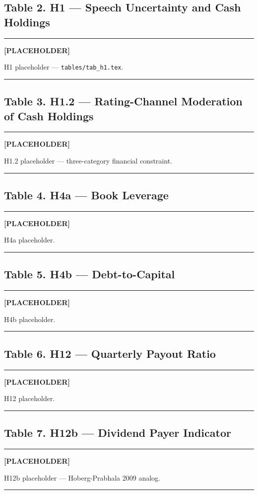 \documentclass[11pt,a4paper,twocolumn]{article}
\newenvironment{placeholder}{%
  \par\medskip\noindent%
  {\color{placeholderaccent}\rule{\linewidth}{0.4pt}}\par%
  \noindent\textbf{\color{placeholderaccent}[PLACEHOLDER]}\par%
  \smallskip\itshape%
}{%
  \par\upshape\smallskip%
  {\color{placeholderaccent}\rule{\linewidth}{0.4pt}}\par\medskip%
}
\begin{document}
\subsection*{Table 2. H1 --- Speech Uncertainty and Cash Holdings}
% 
\begin{placeholder}
H1 placeholder --- \texttt{tables/tab\_h1.tex}.
\end{placeholder}

\subsection*{Table 3. H1.2 --- Rating-Channel Moderation of Cash Holdings}
% 
\begin{placeholder}
H1.2 placeholder --- three-category financial constraint.
\end{placeholder}

\subsection*{Table 4. H4a --- Book Leverage}
% 
\begin{placeholder}
H4a placeholder.
\end{placeholder}

\subsection*{Table 5. H4b --- Debt-to-Capital}
% 
\begin{placeholder}
H4b placeholder.
\end{placeholder}

\subsection*{Table 6. H12 --- Quarterly Payout Ratio}
% 
\begin{placeholder}
H12 placeholder.
\end{placeholder}

\subsection*{Table 7. H12b --- Dividend Payer Indicator}
% 
\begin{placeholder}
H12b placeholder --- Hoberg-Prabhala 2009 analog.
\end{placeholder}
\end{document}
